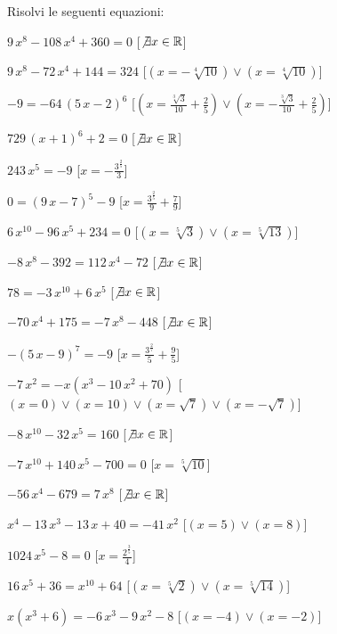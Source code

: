 \begin{esercizio}\label{ese:03.1}
Risolvi le seguenti equazioni:
\begin{enumeratea}
\item $9\,{x}^{8}-108\,{x}^{4}+360=0$ 
\hfill [$\not\exists x \in \mathbb{R}$]
\item $9\,{x}^{8}-72\,{x}^{4}+144=324$ 
\hfill [$(x=-\sqrt [4]{10})\vee (x=\sqrt [4]{10})$]
\item $-9=-64\, \left( 5\,x-2 \right) ^{6}$ 
\hfill [$(x={\frac {\sqrt [3]{3}}{10}}+{\frac {2}{5}})\vee (x=-{\frac {\sqrt 
[3]{3}}{10}}+{\frac {2}{5}})$]
\item $729\, \left( x+1 \right) ^{6}+2=0$ 
\hfill [$\not\exists x \in \mathbb{R}$]
\item $243\,{x}^{5}=-9$ 
\hfill [$x=-{\frac {{3}^{{\frac {2}{5}}}}{3}}$]
\item $0= \left( 9\,x-7 \right) ^{5}-9$ 
\hfill [$x={\frac {{3}^{{\frac {2}{5}}}}{9}}+{\frac {7}{9}}$]
\item $6\,{x}^{10}-96\,{x}^{5}+234=0$ 
\hfill [$(x=\sqrt [5]{3})\vee (x=\sqrt [5]{13})$]
\item $-8\,{x}^{8}-392=112\,{x}^{4}-72$ 
\hfill [$\not\exists x \in \mathbb{R}$]
\item $78=-3\,{x}^{10}+6\,{x}^{5}$ 
\hfill [$\not\exists x \in \mathbb{R}$]
\item $-70\,{x}^{4}+175=-7\,{x}^{8}-448$ 
\hfill [$\not\exists x \in \mathbb{R}$]
\item $- \left( 5\,x-9 \right) ^{7}=-9$ 
\hfill [$x={\frac {{3}^{{\frac {2}{7}}}}{5}}+{\frac {9}{5}}$]
\item $-7\,{x}^{2}=-x \left( {x}^{3}-10\,{x}^{2}+70 \right) $ 
\hfill [$(x=0)\vee (x=10)\vee (x=\sqrt {7})\vee (x=-\sqrt {7})$]
\item $-8\,{x}^{10}-32\,{x}^{5}=160$ 
\hfill [$\not\exists x \in \mathbb{R}$]
\item $-7\,{x}^{10}+140\,{x}^{5}-700=0$ 
\hfill [$x=\sqrt [5]{10}$]
\item $-56\,{x}^{4}-679=7\,{x}^{8}$ 
\hfill [$\not\exists x \in \mathbb{R}$]
\item ${x}^{4}-13\,{x}^{3}-13\,x+40=-41\,{x}^{2}$ 
\hfill [$(x=5)\vee (x=8)$]
\item $1024\,{x}^{5}-8=0$ 
\hfill [$x={\frac {{2}^{{\frac {3}{5}}}}{4}}$]
\item $16\,{x}^{5}+36={x}^{10}+64$ 
\hfill [$(x=\sqrt [5]{2})\vee (x=\sqrt [5]{14})$]
\item $x \left( {x}^{3}+6 \right) =-6\,{x}^{3}-9\,{x}^{2}-8$ 
\hfill [$(x=-4)\vee (x=-2)$]

\end{enumeratea}
\end{esercizio}
